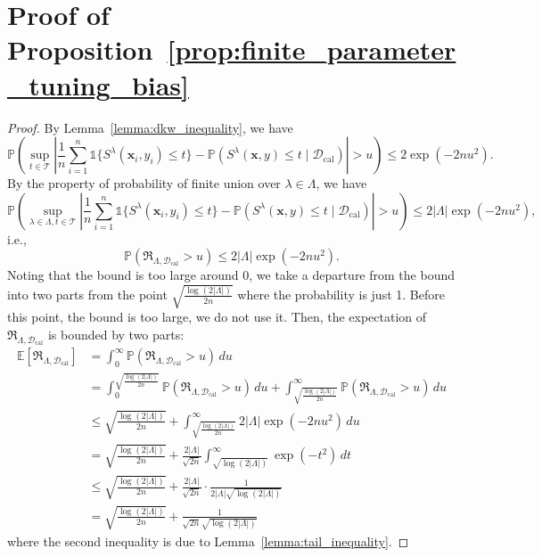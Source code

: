 \documentclass{article}
\renewcommand{\P}{\mathbb{P}}
\newcommand{\E}{\mathbb{E}}
\newcommand{\1}{\mathbbm{1}}
\newcommand{\id}[1]{\mathds{1}\{#1\}}
\theoremstyle{plain}
\theoremstyle{definition}
\theoremstyle{remark}
\begin{document}
\section{Proof of Proposition~\ref{prop:finite_parameter_tuning_bias}}
\label{sec:proof_finite_parameter_tuning_bias}

\begin{proof}
    By Lemma~\ref{lemma:dkw_inequality}, we have
    \begin{equation*}
        \P(\sup_{t\in\mathcal{T}}|\frac{1}{n} \sum_{i=1}^n \id{S^{\lambda}(\boldsymbol{x}_i, y_i) \leq t} - \P(S^{\lambda}(\boldsymbol{x},y) \leq t \mid \mathcal{D}_{\text{cal}})| > u) \leq 2\exp(-2n u^2).
    \end{equation*}
    By the property of probability of finite union over \(\lambda \in \Lambda\), we have
    \begin{equation*}
        \P(\sup_{\lambda \in \Lambda, t \in \mathcal{T}}|\frac{1}{n} \sum_{i=1}^n \id{S^{\lambda}(\boldsymbol{x}_i, y_i) \leq t} - \P(S^{\lambda}(\boldsymbol{x},y) \leq t \mid \mathcal{D}_{\text{cal}})| > u) \leq 2|\Lambda| \exp(-2n u^2),
    \end{equation*}
    i.e.,
    \begin{equation*}
        \P(\mathfrak{R}_{\Lambda, \mathcal{D}_{\text{cal}}} > u ) \leq 2|\Lambda| \exp(-2n u^2).
    \end{equation*}
    Noting that the bound is too large around 0, we take a departure from the bound into two parts from the point \(\sqrt{\frac{\log(2|\Lambda|)}{2n}}\) where the probability is just 1. Before this point, the bound is too large, we do not use it. 
    Then, the expectation of \( \mathfrak{R}_{\Lambda, \mathcal{D}_{\text{cal}}} \) is bounded by two parts:
    \begin{align*}
        \E[\mathfrak{R}_{\Lambda, \mathcal{D}_{\text{cal}}}] 
        &= \int_0^\infty \P(\mathfrak{R}_{\Lambda, \mathcal{D}_{\text{cal}}} > u)\,du \\
        &= \int_0^{\sqrt{\frac{\log(2|\Lambda|)}{2n}}} \P(\mathfrak{R}_{\Lambda, \mathcal{D}_{\text{cal}}} > u)\,du + \int_{\sqrt{\frac{\log(2|\Lambda|)}{2n}}}^\infty \P(\mathfrak{R}_{\Lambda, \mathcal{D}_{\text{cal}}} > u)\,du \\
        &\leq \sqrt{\frac{\log(2|\Lambda|)}{2n}} + \int_{\sqrt{\frac{\log(2|\Lambda|)}{2n}}}^\infty 2|\Lambda|\exp(-2nu^2)\,du \\
        &= \sqrt{\frac{\log(2|\Lambda|)}{2n}} + \frac{2|\Lambda|}{\sqrt{2n}}\int_{\sqrt{\log(2|\Lambda|)}}^\infty \exp(-t^2)\,dt \\
        & \leq \sqrt{\frac{\log(2|\Lambda|)}{2n}} + \frac{2|\Lambda|}{\sqrt{2n}} \cdot \frac{1}{2|\Lambda|\sqrt{\log(2|\Lambda|)}} \\
        & = \sqrt{\frac{\log(2|\Lambda|)}{2n}} + \frac{1}{\sqrt{2n}\sqrt{\log(2|\Lambda|)}}
    \end{align*}
    where the second inequality is due to Lemma~\ref{lemma:tail_inequality}.
\end{proof}
\end{document}
